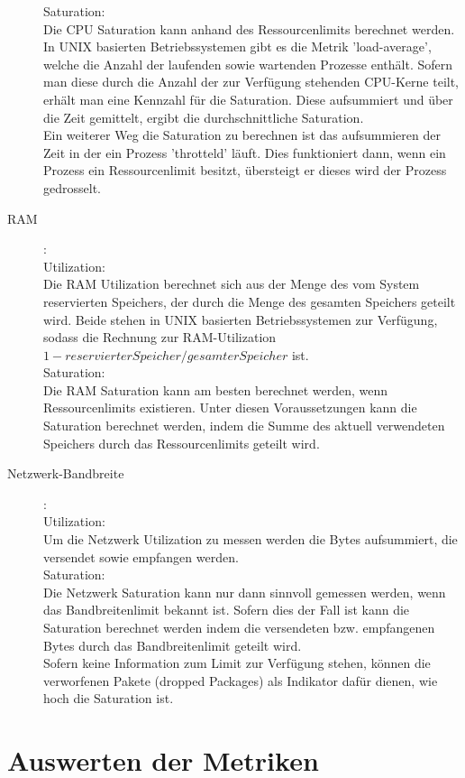 \documentclass[a4paper,10pt]{scrartcl}
\begin{document}
\begin{description}
Saturation:\\
Die CPU Saturation kann anhand des Ressourcenlimits berechnet werden. In UNIX basierten Betriebssystemen gibt es die Metrik 'load-average', welche die Anzahl der laufenden sowie wartenden Prozesse enthält. Sofern man diese durch die Anzahl der zur Verfügung stehenden CPU-Kerne teilt, erhält man eine Kennzahl für die Saturation. Diese aufsummiert und über die Zeit gemittelt, ergibt die durchschnittliche Saturation.\\
Ein weiterer Weg die Saturation zu berechnen ist das aufsummieren der Zeit in der ein Prozess 'throtteld' läuft. Dies funktioniert dann, wenn ein Prozess ein Ressourcenlimit besitzt, übersteigt er dieses wird der Prozess gedrosselt.\\
\item[RAM]:\\
Utilization:\\
Die RAM Utilization berechnet sich aus der Menge des vom System reservierten Speichers, der durch die Menge des gesamten Speichers geteilt wird. Beide stehen in UNIX basierten Betriebssystemen zur Verfügung, sodass die Rechnung zur RAM-Utilization $1 - reservierterSpeicher / gesamterSpeicher$ ist.\\
Saturation:\\
Die RAM Saturation kann am besten berechnet werden, wenn Ressourcenlimits existieren. Unter diesen Voraussetzungen kann die Saturation berechnet werden, indem die Summe des aktuell verwendeten Speichers durch das Ressourcenlimits geteilt wird.\\
\item[Netzwerk-Bandbreite]:\\
Utilization:\\
Um die Netzwerk Utilization zu messen werden die Bytes aufsummiert, die versendet sowie empfangen werden.\\
Saturation:\\
Die Netzwerk Saturation kann nur dann sinnvoll gemessen werden, wenn das Bandbreitenlimit bekannt ist. Sofern dies der Fall ist kann die Saturation berechnet werden indem die versendeten bzw. empfangenen Bytes durch das Bandbreitenlimit geteilt wird. \\
Sofern keine Information zum Limit zur Verfügung stehen, können die verworfenen Pakete (dropped Packages) als Indikator dafür dienen, wie hoch die Saturation ist.
\end{description}

\section{Auswerten der Metriken}
\end{document}
